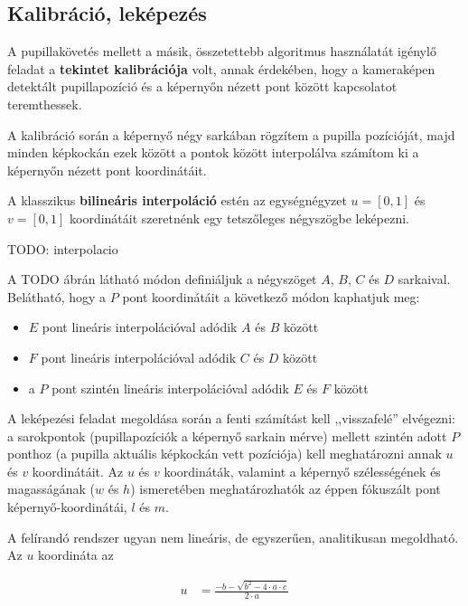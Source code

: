 \subsection{Kalibráció, leképezés}\label{sect:kalibracio}

A pupillakövetés mellett a másik, összetettebb algoritmus használatát igénylő feladat a \textbf{tekintet kalibrációja} volt, annak érdekében, hogy a kameraképen detektált pupillapozíció és a képernyőn nézett pont között kapcsolatot teremthessek.

A kalibráció során a képernyő négy sarkában rögzítem a pupilla pozícióját, majd minden képkockán ezek között a pontok között interpolálva számítom ki a képernyőn nézett pont koordinátáit.

\bigskip

A klasszikus \textbf{bilineáris interpoláció} estén az egységnégyzet $u = [0, 1]$ és $v = [0, 1]$ koordinátáit szeretnénk egy tetszőleges négyszögbe leképezni.

TODO: interpolacio

A TODO ábrán látható módon definiáljuk a négyszöget $A$, $B$, $C$ és $D$ sarkaival. Belátható, hogy a $P$ pont koordinátáit a következő módon kaphatjuk meg:

\begin{itemize}
  \item $E$ pont lineáris interpolációval adódik $A$ és $B$ között
  \item $F$ pont lineáris interpolációval adódik $C$ és $D$ között
  \item a $P$ pont szintén lineáris interpolációval adódik $E$ és $F$ között
\end{itemize}

A leképezési feladat megoldása során a fenti számítást kell ,,visszafelé'' elvégezni: a sarokpontok (pupillapozíciók a képernyő sarkain mérve) mellett szintén adott $P$ ponthoz (a pupilla aktuális képkockán vett pozíciója) kell meghatározni annak $u$ és $v$ koordinátáit. Az $u$ és $v$ koordináták, valamint a képernyő szélességének és magasságának ($w$ és $h$) ismeretében meghatározhatók az éppen fókuszált pont képernyő-koordinátái, $l$ és $m$.

A felírandó rendszer ugyan nem lineáris, de egyszerűen, analitikusan megoldható. Az $u$ koordináta az

\begin{align}\label{eq:calib_1}
u &= \frac{-b - \sqrt{b^2 - 4 \cdot a \cdot c}}{2 \cdot a}
\end{align}

